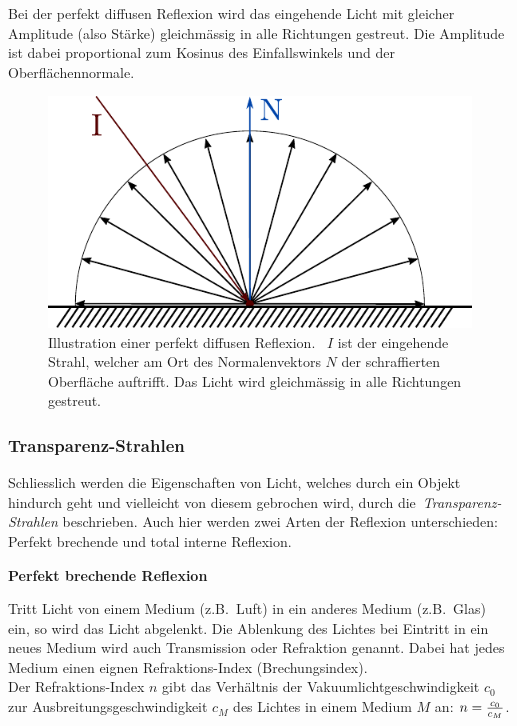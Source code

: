 Bei der perfekt diffusen Reflexion wird das eingehende Licht mit
gleicher Amplitude (also Stärke) gleichmässig in alle Richtungen
gestreut. Die Amplitude ist dabei proportional zum Kosinus des
Einfallswinkels und der Oberflächennormale.

\begin{figure}[H]\label{fig:ray_tracing_diffuse_reflection}
    \centering
    \includegraphics{img/perfect_diffuse_reflection.pdf}
    \caption{Illustration einer perfekt diffusen
        Reflexion.~\protect\footnotemark{}
        $I$ ist der eingehende Strahl, welcher am Ort des
        Normalenvektors $N$ der schraffierten Oberfläche auftrifft. Das
        Licht wird gleichmässig in alle Richtungen gestreut.}
\end{figure}

\subsubsection{Transparenz-Strahlen}
\label{ssubsec:ray_tracing:transparency_rays}

Schliesslich werden die Eigenschaften von Licht, welches durch ein
Objekt hindurch geht und vielleicht von diesem gebrochen wird, durch
die~\textit{Transparenz-Strahlen} beschrieben. Auch hier werden zwei
Arten der Reflexion unterschieden: Perfekt brechende und total interne
Reflexion.

\textbf{Perfekt brechende Reflexion}

Tritt Licht von einem Medium (z.B.~Luft) in ein anderes Medium (z.B.\
Glas) ein, so wird das Licht abgelenkt. Die Ablenkung des Lichtes bei
Eintritt in ein neues Medium wird auch Transmission oder Refraktion
genannt. Dabei hat jedes Medium einen eignen Refraktions-Index
(Brechungsindex).\\
Der Refraktions-Index $n$ gibt das Verhältnis der
Vakuumlichtgeschwindigkeit $c_{0}$ zur Ausbreitungsgeschwindigkeit
$c_{M}$ des Lichtes in einem Medium $M$ an: $n = {c_{0} \over c_{M}}$.


